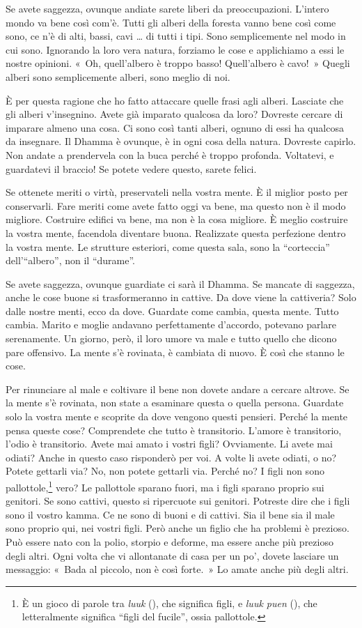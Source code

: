 Se avete saggezza, ovunque andiate sarete liberi da preoccupazioni.
L'intero mondo va bene così com'è. Tutti gli alberi della foresta vanno
bene così come sono, ce n'è di alti, bassi, cavi \ldots{} di tutti i tipi.
Sono semplicemente nel modo in cui sono. Ignorando la loro vera natura,
forziamo le cose e applichiamo a essi le nostre opinioni. «~Oh,
quell'albero è troppo basso! Quell'albero è cavo!~» Quegli alberi sono
semplicemente alberi, sono meglio di noi.

È per questa ragione che ho fatto attaccare quelle frasi agli alberi.
Lasciate che gli alberi v'insegnino. Avete già imparato qualcosa da
loro? Dovreste cercare di imparare almeno una cosa. Ci sono così tanti
alberi, ognuno di essi ha qualcosa da insegnare. Il Dhamma è ovunque, è
in ogni cosa della natura. Dovreste capirlo. Non andate a prendervela
con la buca perché è troppo profonda. Voltatevi, e guardatevi il
braccio! Se potete vedere questo, sarete felici.

Se ottenete meriti o virtù, preservateli nella vostra mente. È il
miglior posto per conservarli. Fare meriti come avete fatto oggi va
bene, ma questo non è il modo migliore. Costruire edifici va bene, ma
non è la cosa migliore. È meglio costruire la vostra mente, facendola
diventare buona. Realizzate questa perfezione dentro la vostra mente. Le
strutture esteriori, come questa sala, sono la ``corteccia''
dell'``albero'', non il ``durame''.

Se avete saggezza, ovunque guardiate ci sarà il Dhamma. Se mancate di
saggezza, anche le cose buone si trasformeranno in cattive. Da dove
viene la cattiveria? Solo dalle nostre menti, ecco da dove. Guardate
come cambia, questa mente. Tutto cambia. Marito e moglie andavano
perfettamente d'accordo, potevano parlare serenamente. Un giorno, però,
il loro umore va male e tutto quello che dicono pare offensivo. La mente
s'è rovinata, è cambiata di nuovo. È così che stanno le cose.

Per rinunciare al male e coltivare il bene non dovete andare a cercare
altrove. Se la mente s'è rovinata, non state a esaminare questa o quella
persona. Guardate solo la vostra mente e scoprite da dove vengono questi
pensieri. Perché la mente pensa queste cose? Comprendete che tutto è
transitorio. L'amore è transitorio, l'odio è transitorio. Avete mai
amato i vostri figli? Ovviamente. Li avete mai odiati? Anche in questo
caso risponderò per voi. A volte li avete odiati, o no? Potete gettarli
via? No, non potete gettarli via. Perché no? I figli non sono
pallottole,\footnote{È un gioco di parole tra \emph{luuk} (), che
  significa figli, e \emph{luuk puen} (), che letteralmente
  significa ``figli del fucile'', ossia pallottole.} vero? Le pallottole
sparano fuori, ma i figli sparano proprio sui genitori. Se sono cattivi,
questo si ripercuote sui genitori. Potreste dire che i figli sono il
vostro kamma. Ce ne sono di buoni e di cattivi. Sia il bene sia
il male sono proprio qui, nei vostri figli. Però anche un figlio che ha
problemi è prezioso. Può essere nato con la polio, storpio e deforme, ma
essere anche più prezioso degli altri. Ogni volta che vi allontanate di
casa per un po', dovete lasciare un messaggio: «~Bada al piccolo, non è
così forte.~» Lo amate anche più degli altri.

